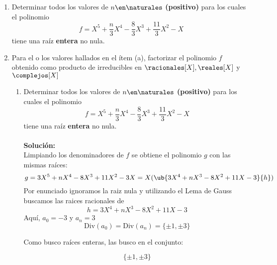 \ejercicio
\begin{enumerate}[label=\alph*)]
\item
    Determinar todos los valores de $n\en\naturales$ \textbf{(positivo)} para los cuales el polinomio
    $$
      f=X^5 + \frac{n}{3}X^4 - \frac{8}{3}X^3 + \frac{11}{3}X^2 - X
    $$
      tiene una raíz \textbf{entera} no nula. 
\item
Para el o los valores hallados en el ítem (a), factorizar el polinomio $f$ obtenido como producto de irreducibles en $\racionales[X],\reales[X]$ y $\complejos[X]$ 

\sepadaradorCorto

\begin{enumerate}[label=\alph*)]
\item
Determinar todos los valores de $n\en\naturales$ \textbf{(positivo)} para los cuales el polinomio
$$
f=X^5 + \frac{n}{3}X^4 - \frac{8}{3}X^3 + \frac{11}{3}X^2 - X
$$
tiene una raíz \textbf{entera} no nula. 
\\
\\
\textbf{Solución:}
\\
Limpiando los denominadores de $f$ se obtiene el polinomio $g$ con las mismas raíces:
$$
g=3X^5 + nX^4 - 8X^3 + 11X^2 - 3X= X(\ub{3X^4 + nX^3 - 8X^2 + 11X - 3}{h})
$$
Por enunciado ignoramos la raiz nula y utilizando el Lema de Gauss buscamos las raices racionales de
$$
h=3X^4 + nX^3 - 8X^2 + 11X - 3
$$
Aquí, $a_0=-3$ y $a_n=3$
\\
$$
\text{Div}(a_0)=\text{Div}(a_n)=\{\pm1,\pm3\}
$$

Como busco raíces enteras, las busco en el conjunto:

$$
\{ \pm1,\pm3 \}
$$


\end{enumerate}
\end{enumerate}
